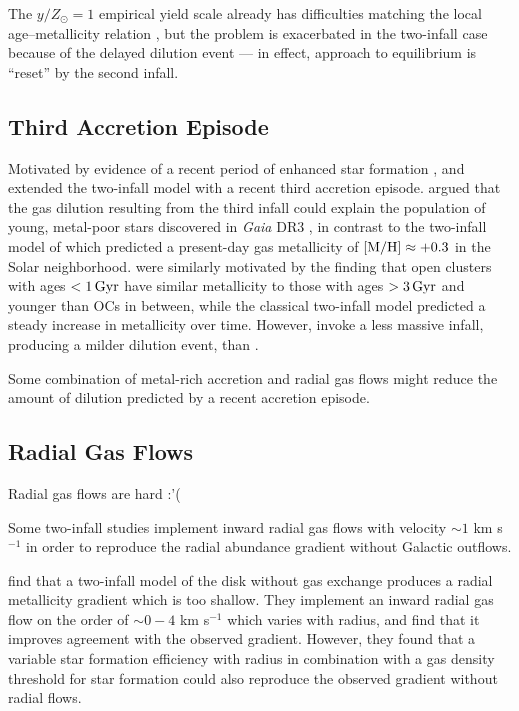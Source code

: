 \documentclass[twocolumn,twocolappendix,linenumbers]{aastex631}
\newcommand{\todo}[1]{{\color{red}#1}}
\newcommand{\yZ}[1]{$y/Z_\odot=#1$}
\newcommand{\Gyr}{\,{\rm Gyr}}
\begin{document}
The \yZ{1} empirical yield scale already has difficulties matching the local age--metallicity relation \citep{johnson_milky_2024}, but the problem is exacerbated in the two-infall case because of the delayed dilution event --- in effect, approach to equilibrium is ``reset'' by the second infall.

\subsection{Third Accretion Episode}

Motivated by evidence of a recent period of enhanced star formation \citep[e.g.,][]{ruiz-lara_recurrent_2020}, \citet{spitoni_beyond_2023} and \citet{palla_mapping_2024} extended the two-infall model with a recent third accretion episode. \citet{spitoni_beyond_2023} argued that the gas dilution resulting from the third infall could explain the population of young, metal-poor stars discovered in {\it Gaia} DR3 \citep{recio-blanco_gaia_2023}, in contrast to the two-infall model of \citet{spitoni_apogee_2021} which predicted a present-day gas metallicity of ${\rm [M/H]}\approx+0.3$ in the Solar neighborhood. \citet{palla_mapping_2024} were similarly motivated by the finding that open clusters with ages $<1\Gyr$ have similar metallicity to those with ages $>3\Gyr$ \todo{and younger than OCs in between}, while the classical two-infall model predicted a steady increase in metallicity over time. However, \citet{palla_mapping_2024} invoke a less massive infall, producing a milder dilution event, than \citet{spitoni_beyond_2023}.

Some combination of metal-rich accretion and radial gas flows might reduce the amount of dilution predicted by a recent accretion episode.

\subsection{Radial Gas Flows}
\label{sec:radial-flows}

\todo{Radial gas flows are hard :'(}

Some two-infall studies \citep[e.g.,][]{spitoni_effects_2011,palla_chemical_2020,palla_mapping_2024} implement inward radial gas flows with velocity $\sim1$ km s$^{-1}$ in order to reproduce the radial abundance gradient without Galactic outflows.

\citet{spitoni_effects_2011} find that a two-infall model of the disk without gas exchange produces a radial metallicity gradient which is too shallow. They implement an inward radial gas flow on the order of $\sim0-4$ km s$^{-1}$ which varies with radius, and find that it improves agreement with the observed gradient. However, they found that a variable star formation efficiency with radius in combination with a gas density threshold for star formation could also reproduce the observed gradient without radial flows.
\end{document}
